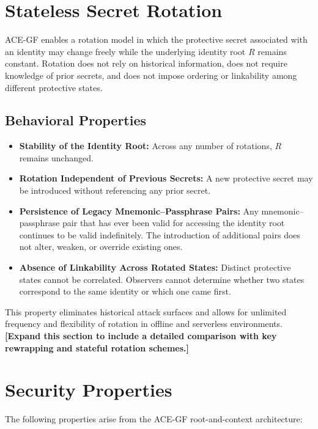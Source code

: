 \documentclass[11pt,a4paper]{article}
\begin{document}
\section{Stateless Secret Rotation}
ACE-GF enables a rotation model in which the protective secret associated with an identity may change freely while the underlying identity root $R$ remains constant. Rotation does not rely on historical information, does not require knowledge of prior secrets, and does not impose ordering or linkability among different protective states.

\subsection{Behavioral Properties}
\begin{itemize}[noitemsep, nolistsep]
    \item \textbf{Stability of the Identity Root:} Across any number of rotations, $R$ remains unchanged.
    \item \textbf{Rotation Independent of Previous Secrets:} A new protective secret may be introduced without referencing any prior secret.
    \item \textbf{Persistence of Legacy Mnemonic--Passphrase Pairs:} Any mnemonic--passphrase pair that has ever been valid for accessing the identity root continues to be valid indefinitely. The introduction of additional pairs does not alter, weaken, or override existing ones.
    \item \textbf{Absence of Linkability Across Rotated States:} Distinct protective states cannot be correlated. Observers cannot determine whether two states correspond to the same identity or which one came first.
\end{itemize}
This property eliminates historical attack surfaces and allows for unlimited frequency and flexibility of rotation in offline and serverless environments.
\textbf{[Expand this section to include a detailed comparison with key rewrapping and stateful rotation schemes.]}

\section{Security Properties}
The following properties arise from the ACE-GF root-and-context architecture:
\end{document}
